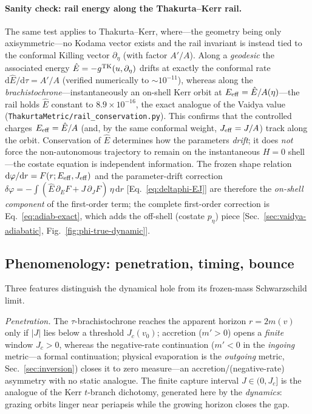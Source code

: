 \documentclass[12pt]{iopart}
\newcommand{\Ehat}{\hat E}
\newcommand{\Jc}{J_{c}}
\begin{document}
\paragraph{Sanity check: rail energy along the Thakurta--Kerr rail.} The same
test applies to Thakurta--Kerr, where---the geometry being only axisymmetric---no
Kodama vector exists and the rail invariant is instead tied to the conformal
Killing vector $\partial_\eta$ (with factor $A'/A$). Along a \emph{geodesic} the
associated energy $\Ehat=-g^{\rm TK}(u,\partial_\eta)$ drifts at exactly the
conformal rate $\mathrm{d}\Ehat/\mathrm{d}\tau=A'/A$ (verified numerically to
$\sim\!10^{-11}$), whereas along the \emph{brachistochrone}---instantaneously an
on-shell Kerr orbit at $E_{\rm eff}=\Ehat/A(\eta)$---the rail holds $\Ehat$
constant to $8.9\times10^{-16}$, the exact analogue of the Vaidya value
(\texttt{ThakurtaMetric/rail\_conservation.py}). This confirms that the controlled charges
$E_{\rm eff}=\Ehat/A$ (and, by the same conformal weight, $J_{\rm eff}=J/A$)
track along the orbit. Conservation of $\Ehat$ determines how the parameters
\emph{drift}; it does \emph{not} force the non-autonomous trajectory to remain on
the instantaneous $H=0$ shell---the costate equation is independent information.
The frozen shape relation $\mathrm{d}\varphi/\mathrm{d}r=F(r;E_{\rm eff},J_{\rm eff})$
and the parameter-drift correction
$\delta\varphi=-\int(\Ehat\,\partial_E F+J\,\partial_J F)\,\eta\,\mathrm{d}r$
[Eq.~\eqref{eq:deltaphi-EJ}] are therefore the \emph{on-shell component} of the
first-order term; the complete first-order correction is
Eq.~\eqref{eq:adiab-exact}, which adds the off-shell (costate $p_\eta$) piece
[Sec.~\ref{sec:vaidya-adiabatic}, Fig.~\ref{fig:phi-true-dynamic}].


\subsection{Phenomenology: penetration, timing, bounce}
\label{sec:vaidya-pheno}
Three features distinguish the dynamical hole from its frozen-mass
Schwarzschild limit.

\emph{Penetration.} The $\tau$-brachistochrone reaches the apparent horizon
$r=2m(v)$ only if $|J|$ lies below a threshold $J_c(v_0)$; accretion ($m'>0$)
opens a \emph{finite} window $J_c>0$, whereas the negative-rate continuation
($m'<0$ in the \emph{ingoing} metric---a formal continuation; physical evaporation is
the \emph{outgoing} metric, Sec.~\ref{sec:inversion}) closes it to zero
measure---an accretion/(negative-rate) asymmetry with no static analogue. The
finite capture interval $J\in(0,\Jc]$ is the analogue of the Kerr $t$-branch
dichotomy, generated here by the \emph{dynamics}: grazing orbits linger near
periapsis while the growing horizon closes the gap.
\end{document}
